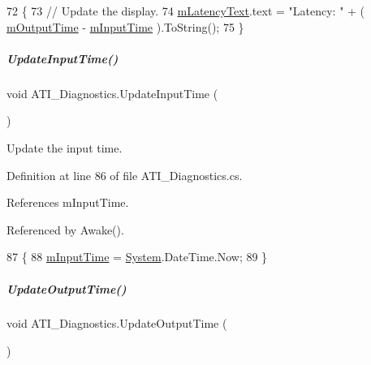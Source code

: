 \begin{DoxyCode}
72     \{
73         \textcolor{comment}{// Update the display.}
74         \hyperlink{group___audio_testing_a8929a6a2ae14ec733b936a72cb0f44a6}{mLatencyText}.text = \textcolor{stringliteral}{"Latency: "} + ( \hyperlink{group___audio_testing_a2e6f675a990948db789381f52071e1bf}{mOutputTime} - 
      \hyperlink{group___audio_testing_a683f09700eab208b7368ebcb82bbd3be}{mInputTime} ).ToString();
75     \}
\end{DoxyCode}
\mbox{\label{group___audio_testing_afcdfad4dc61b1f22a6efcef738897515}} 
\subparagraph{\texorpdfstring{Update\+Input\+Time()}{UpdateInputTime()}}
{\footnotesize\ttfamily void A\+T\+I\+\_\+\+Diagnostics.\+Update\+Input\+Time (\begin{DoxyParamCaption}{ }\end{DoxyParamCaption})\hspace{0.3cm}{\ttfamily [private]}}



Update the input time. 



Definition at line 86 of file A\+T\+I\+\_\+\+Diagnostics.\+cs.



References m\+Input\+Time.



Referenced by Awake().


\begin{DoxyCode}
87     \{
88         \hyperlink{group___audio_testing_a683f09700eab208b7368ebcb82bbd3be}{mInputTime} = \hyperlink{namespace_system}{System}.DateTime.Now;
89     \}
\end{DoxyCode}
\mbox{\label{group___audio_testing_ac172cf129d078d8b0e979bc17d11c5a0}} 
\subparagraph{\texorpdfstring{Update\+Output\+Time()}{UpdateOutputTime()}}
{\footnotesize\ttfamily void A\+T\+I\+\_\+\+Diagnostics.\+Update\+Output\+Time (\begin{DoxyParamCaption}{ }\end{DoxyParamCaption})\hspace{0.3cm}{\ttfamily [private]}}



